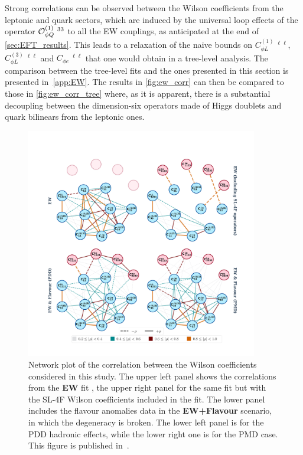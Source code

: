 Strong correlations can be observed between the Wilson coefficients from the leptonic and quark sectors, which are induced by the universal loop effects of the operator ${\cal O}_{\phi Q}^{(1)}\ ^{33}$ to all the EW couplings, as anticipated at the end of \autoref{sec:EFT_results}. 
This leads to a relaxation of the naive bounds on $C_{\phi L}^{(1)}\ ^{\ell\ell}$,$C_{\phi L}^{(3)}\ ^{\ell\ell}$ and $C_{\phi e}\ ^{\ell\ell}$ that one would obtain in a tree-level analysis.
The comparison between the tree-level fits and the ones presented in this section is presented in~\autoref{app:EW}. The results in \autoref{fig:ew_corr} can then be compared to those in \autoref{fig:ew_corr_tree} where, as it is apparent, there is a substantial decoupling between the dimension-six operators made of Higgs doublets and quark bilinears from the leptonic ones.
\begin{figure}[h!]
	\centering
	\includegraphics[width=0.9\textwidth]{figures/fixed_EW_flavour.pdf}
	\caption{ Network plot of the correlation between the Wilson coefficients considered in this study. The upper left panel shows the correlations from the \textbf{EW} fit , the upper right panel for the same fit but with the SL-4F Wilson coefficients included in the fit. The lower panel includes the flavour anomalies data  in the \textbf{EW+Flavour}  scenario, in which the degeneracy is broken. The lower left panel is for the PDD hadronic effects, while the lower right one is for the PMD case. This figure is published in~\cite{Alasfar:2020mne}. 
	}
	\label{fig:ew_flav_corr}
\end{figure}
